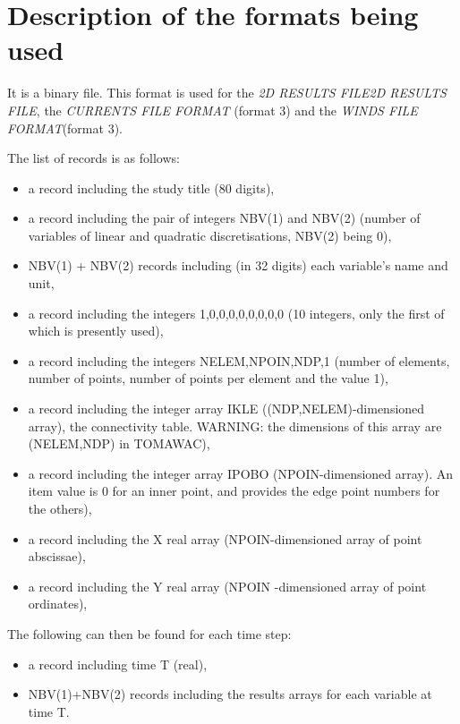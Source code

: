 \section{ Description of the formats being used}
\label{se:desformat}
 \textbf{}
 It is a binary file. This format is used for the \textit{2D RESULTS FILE2D RESULTS FILE}, the \textit{CURRENTS FILE FORMAT} (format 3) and the \textit{WINDS FILE FORMAT}(format 3).

 The list of records is as follows:

\begin{itemize}
\item  a record including the study title (80 digits),
\item  a record including the pair of integers NBV(1) and NBV(2) (number of variables of linear and quadratic discretisations, NBV(2) being 0),
\item  NBV(1) + NBV(2) records including (in 32 digits) each variable's name and unit,
\item  a record including the integers 1,0,0,0,0,0,0,0,0 (10 integers, only the first of which is presently used),
\item  a record including the integers NELEM,NPOIN,NDP,1 (number of elements, number of points, number of points per element and the value 1),
\item  a record including the integer array IKLE ((NDP,NELEM)-dimensioned array), the connectivity table. WARNING: the dimensions of this array are (NELEM,NDP) in TOMAWAC),
\item  a record including the integer array IPOBO (NPOIN-dimensioned array). An item value is 0 for an inner point, and provides the edge point numbers for the others),
\item  a record including the X real array (NPOIN-dimensioned array of point abscissae),
\item  a record including the Y real array (NPOIN -dimensioned array of point ordinates),
\end{itemize}

 The following can then be found for each time step:

\begin{itemize}
\item  a record including time T (real),
\item  NBV(1)+NBV(2) records including the results arrays for each variable at time T.
\end{itemize}

